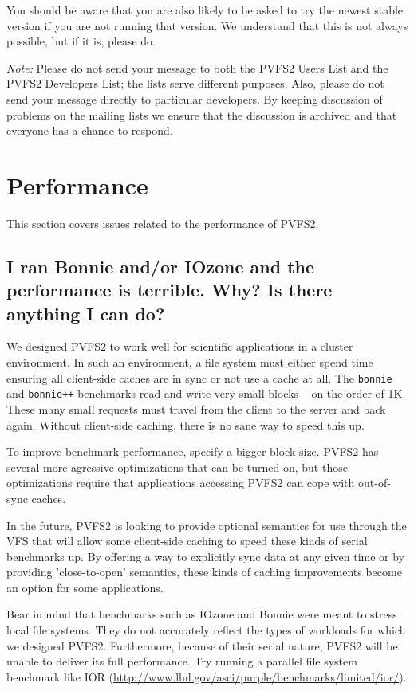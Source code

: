 \documentclass[11pt,letterpaper]{article}
\begin{document}
You should be aware that you are also likely to be asked to try the newest
stable version if you are not running that version.  We understand that this
is not always possible, but if it is, please do.

\emph{Note:} Please do not send your message to both the PVFS2 Users List and
the PVFS2 Developers List; the lists serve different purposes.  Also, please
do not send your message directly to particular developers.  By keeping
discussion of problems on the mailing lists we ensure that the discussion is
archived and that everyone has a chance to respond.

%
%
\section{Performance}

This section covers issues related to the performance of PVFS2.

\subsection{I ran Bonnie and/or IOzone and the performance is terrible.
Why? Is there anything I can do?}
\label{sec:badperf}

We designed PVFS2 to work well for scientific applications in a cluster
environment.  In such an environment, a file system must either spend time
ensuring all client-side caches are in sync or not use a cache at all.  The
\texttt{bonnie} and \texttt{bonnie++} benchmarks read and write very small
blocks -- on the order of 1K.  These many small requests must travel from the
client to the server and back again.  Without client-side caching, there
is no sane way to speed this up.

To improve benchmark performance, specify a bigger block size.   PVFS2
has several more agressive optimizations that can be turned on, but
those optimizations require that applications accessing PVFS2 can cope
with out-of-sync caches.  

In the future, PVFS2 is looking to provide optional semantics for use
through the VFS that will allow some client-side caching to speed these
kinds of serial benchmarks up.  By offering a way to explicitly sync
data at any given time or by providing 'close-to-open' semantics, these
kinds of caching improvements become an option for some applications.

Bear in mind that benchmarks such as IOzone and Bonnie were meant to
stress local file systems.   They do not accurately reflect the types of
workloads for which we designed PVFS2.  Furthermore, because of their
serial nature, PVFS2 will be unable to deliver its full performance.
Try running a parallel file system benchmark like IOR
(\url{http://www.llnl.gov/asci/purple/benchmarks/limited/ior/}).
\end{document}
